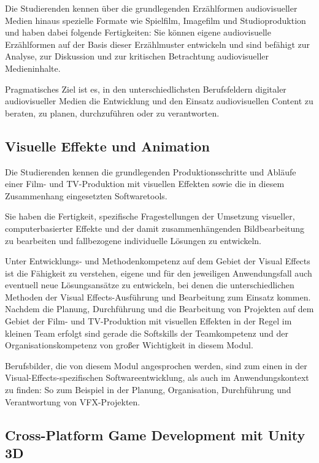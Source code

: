 Die Studierenden kennen über die grundlegenden Erzählformen
audiovisueller Medien hinaus spezielle Formate wie Spielfilm, Imagefilm
und Studioproduktion und haben dabei folgende Fertigkeiten: Sie können
eigene audiovisuelle Erzählformen auf der Basis dieser Erzählmuster
entwickeln und sind befähigt zur Analyse, zur Diskussion und zur
kritischen Betrachtung audiovisueller Medieninhalte.

Pragmatisches Ziel ist es, in den unterschiedlichsten Berufsfeldern
digitaler audiovisueller Medien die Entwicklung und den Einsatz
audiovisuellen Content zu beraten, zu planen, durchzuführen oder zu
verantworten.

\subsection{Visuelle Effekte und
Animation}\label{visuelle-effekte-und-animation}

Die Studierenden kennen die grundlegenden Produktionsschritte und
Abläufe einer Film- und TV-Produktion mit visuellen Effekten sowie die
in diesem Zusammenhang eingesetzten Softwaretools.

Sie haben die Fertigkeit, spezifische Fragestellungen der Umsetzung
visueller, computerbasierter Effekte und der damit zusammenhängenden
Bildbearbeitung zu bearbeiten und fallbezogene individuelle Lösungen zu
entwickeln.

Unter Entwicklungs- und Methodenkompetenz auf dem Gebiet der Visual
Effects ist die Fähigkeit zu verstehen, eigene und für den jeweiligen
Anwendungsfall auch eventuell neue Lösungsansätze zu entwickeln, bei
denen die unterschiedlichen Methoden der Visual Effects-Ausführung und
Bearbeitung zum Einsatz kommen. Nachdem die Planung, Durchführung und
die Bearbeitung von Projekten auf dem Gebiet der Film- und TV-Produktion
mit visuellen Effekten in der Regel im kleinen Team erfolgt sind gerade
die Softskills der Teamkompetenz und der Organisationskompetenz von
großer Wichtigkeit in diesem Modul.

Berufsbilder, die von diesem Modul angesprochen werden, sind zum einen
in der Visual-Effects-spezifischen Softwareentwicklung, als auch im
Anwendungskontext zu finden: So zum Beispiel in der Planung,
Organisation, Durchführung und Verantwortung von VFX-Projekten.

\subsection{Cross-Platform Game Development mit Unity
3D}\label{cross-platform-game-development-mit-unity-3d}

